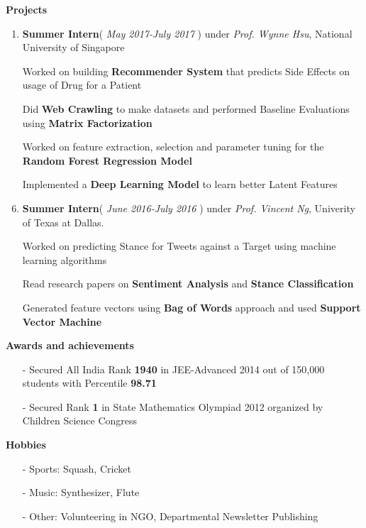 \documentclass[a4paper, 10pt]{article}
\begin{document}
\hspace*{1.5ex}\textbf{Projects}
\begin{enumerate}
   \item \textbf{Summer Intern}( \textit{May 2017-July 2017} ) under \textit{Prof. Wynne Hsu}, National University of Singapore 
\item[] Worked on building \textbf{Recommender System} that predicts Side Effects on usage of Drug for a Patient
\item[] Did \textbf{Web Crawling} to make datasets and performed Baseline Evaluations using \textbf{Matrix Factorization}
\item[] Worked on feature extraction, selection and parameter tuning for the \textbf{Random Forest Regression Model}
\item[] Implemented a \textbf{Deep Learning Model} to learn better Latent Features 
   	
   \item \textbf{Summer Intern}( \textit{June 2016-July 2016} ) under \textit{Prof. Vincent Ng}, Univerity of Texas at Dallas. 
   \item[] Worked on predicting Stance for Tweets against a Target using machine learning algorithms 
   \item[] Read research papers on \textbf{Sentiment Analysis} and \textbf{Stance Classification}
   \item[] Generated feature vectors using \textbf{Bag of Words} approach and used \textbf{Support Vector Machine}
   
\end{enumerate}
\hspace*{1.5ex}\textbf{Awards and achievements}
\begin{itemize}
\item[-] Secured All India Rank \textbf{1940} in JEE-Advanced 2014 out of 150,000 students with Percentile \textbf{98.71}
\item[-] Secured Rank \textbf{1} in State Mathematics Olympiad 2012 organized by Children Science Congress
\end{itemize}
\hspace*{1.5ex}\textbf{Hobbies}
\begin{itemize}
\item[-] Sports: Squash, Cricket
\item[-] Music: Synthesizer, Flute
\item[-] Other: Volunteering in NGO, Departmental Newsletter Publishing
\end{itemize} 
\end{document}
